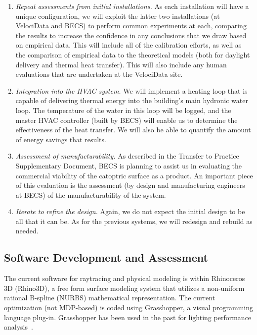 \begin{enumerate}

\item \emph{Repeat assessments from initial installations.}
As each installation will have a unique configuration, we will exploit the
latter two installations (at VelociData and BECS) to perform common
experiments at each, comparing the results to increase the confidence
in any conclusions that we draw based on empirical data.
This will include all of the calibration efforts, as well as the comparison
of empirical data to the theoretical models (both for daylight delivery
and thermal heat transfer).
This will also include any human evaluations that are undertaken at
the VelociData site.

\item \emph{Integration into the HVAC system.}
We will implement a heating loop that is capable of delivering
thermal energy into the building's main hydronic water loop.
The temperature of the water in this loop will be logged, and the
master HVAC controller (built by BECS) will enable us to determine
the effectiveness of the heat transfer.  We will also be able to
quantify the amount of energy savings that results.

\item \emph{Assessment of manufacturability.}
As described in the Transfer to Practice Supplementary Document, BECS
is planning to assist us in evaluating the commercial viability of the
catoptric surface as a product.  An important piece of this evaluation is
the assessment (by design and manufacturing engineers at BECS) of the
manufacturability of the system.

\item \emph{Iterate to refine the design.} Again, we do not expect the initial design
to be all that it can be. As for the previous systems, we will redesign
and rebuild as needed.

\end{enumerate}

\subsection{Software Development and Assessment}

The current software for raytracing and physical modeling is within
Rhinoceros 3D (Rhino3D), a free form surface modeling system that utilizes a
non-uniform rational B-spline (NURBS) mathematical representation.
The current optimization (not MDP-based) is coded using
Grasshopper, a visual programming language plug-in.
Grasshopper has been used in the past for lighting performance
analysis~\cite{Echarri16,Willis16}.

